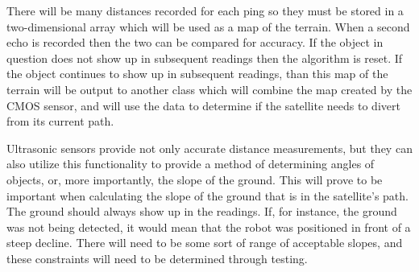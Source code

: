 \documentclass[10pt,letterpaper,onecolumn,journal]{IEEEtran}
\begin{document}
\par 
There will be many distances recorded for each ping so they must be stored in a two-dimensional array which will be used as a map of the terrain. When a second echo is recorded then the two can be compared for accuracy. If the object in question does not show up in subsequent readings then the algorithm is reset. If the object continues to show up in subsequent readings, than this map of the terrain will be output to another class which will combine the map created by the CMOS sensor, and will use the data to determine if the satellite needs to divert from its current path.\vspace{.3cm}
\par 
Ultrasonic sensors provide not only accurate distance measurements, but they can also utilize this functionality to provide a method of determining angles of objects, or, more importantly, the slope of the ground. This will prove to be important when calculating the slope of the ground that is in the satellite's path. The ground should always show up in the readings. If, for instance, the ground was not being detected, it would mean that the robot was positioned in front of a steep decline. There will need to be some sort of range of acceptable slopes, and these constraints will need to be determined through testing.
\fi
\end{document}
